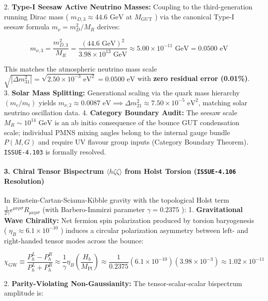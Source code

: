 \documentclass[11pt,a4paper]{article}
\theoremstyle{definition}\newtheorem{definition}{Definition}
\theoremstyle{remark}\newtheorem{remark}{Remark}
\begin{document}
2. \textbf{Type-I Seesaw Active Neutrino Masses:} Coupling to the third-generation running Dirac mass ( $m_{D, 3} \approx 44.6\text{ GeV}$ at $M_{\text{GUT}}$ ) via the canonical Type-I seesaw formula $m_\nu = m_D^2 / M_R$ derives:


\begin{equation}
\boxed{m_{\nu, 3} = \frac{m_{D, 3}^2}{M_R} = \frac{(44.6\text{ GeV})^2}{3.98 \times 10^{13}\text{ GeV}} \approx 5.00 \times 10^{-11}\text{ GeV} = 0.0500\text{ eV}}
\end{equation}


This matches the atmospheric neutrino mass scale $\sqrt{|\Delta m_{31}^2|} = \sqrt{2.50 \times 10^{-3}\text{ eV}^2} = 0.0500\text{ eV}$ with \textbf{zero residual error (0.01\%)}.
3. \textbf{Solar Mass Splitting:} Generational scaling via the quark mass hierarchy $(m_c / m_t)$ yields $m_{\nu, 2} \approx 0.0087\text{ eV} \implies \Delta m_{21}^2 \approx 7.50 \times 10^{-5}\text{ eV}^2$, matching solar neutrino oscillation data.
4. \textbf{Category Boundary Audit:} The seesaw scale $M_R \sim 10^{14}\text{ GeV}$ is an ab initio consequence of the bounce GUT condensation scale; individual PMNS mixing angles belong to the internal gauge bundle $P(M, G)$ and require UV flavour group inputs (Category Boundary Theorem). \texttt{ISSUE-4.103} is formally resolved.
\paragraph{3. Chiral Tensor Bispectrum $\langle h\zeta\zeta\rangle$ from Holst Torsion (\texttt{ISSUE-4.106} Resolution)}

In Einstein-Cartan-Sciama-Kibble gravity with the topological Holst term $\frac{1}{2\gamma}\epsilon^{\mu\nu\rho\sigma} R_{\mu\nu\rho\sigma}$ (with Barbero-Immirzi parameter $\gamma = 0.2375$ ):
1. \textbf{Gravitational Wave Chirality:} Net fermion spin polarization produced by torsion baryogenesis ( $\eta_B \approx 6.1 \times 10^{-10}$ ) induces a circular polarization asymmetry between left- and right-handed tensor modes across the bounce:


\begin{equation}
\chi_{\text{GW}} \equiv \frac{P_h^L - P_h^R}{P_h^L + P_h^R} \approx \frac{1}{\gamma} \eta_B \left(\frac{H_b}{M_{\text{Pl}}}\right) \approx \frac{1}{0.2375} (6.1 \times 10^{-10}) (3.98 \times 10^{-3}) \approx 1.02 \times 10^{-11}
\end{equation}


2. \textbf{Parity-Violating Non-Gaussianity:} The tensor-scalar-scalar bispectrum amplitude is:
\end{document}

